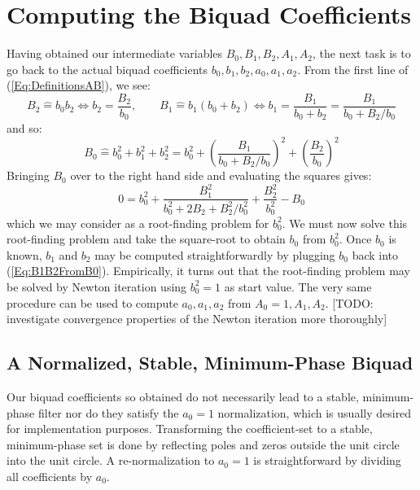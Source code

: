 \section{Computing the Biquad Coefficients}
Having obtained our intermediate variables $B_0, B_1, B_2, A_1, A_2$, the next task is to go back to the actual biquad coefficients $b_0, b_1, b_2, a_0, a_1, a_2$. From the first line of (\ref{Eq:DefinitionsAB}), we see:
\begin{equation}
\label{Eq:B1B2FromB0}
 B_2 \hat{=} b_0 b_2         \Leftrightarrow b_2 = \frac{B_2}{b_0}, \qquad
 B_1 \hat{=} b_1 (b_0 + b_2) \Leftrightarrow b_1 = \frac{B_1}{b_0 + b_2} = \frac{B_1}{b_0 + B_2/b_0}
\end{equation}
and so:
\begin{equation}
 B_0 \hat{=} b_0^2 + b_1^2 + b_2^2 
 =   b_0^2 
   + \left( \frac{B_1}{b_0 + B_2/b_0} \right)^2 
   + \left( \frac{B_2}{b_0}           \right)^2
\end{equation}
Bringing $B_0$ over to the right hand side and evaluating the squares gives:
\begin{equation}
 0 =   b_0^2 
     + \frac{B_1^2}{b_0^2 + 2 B_2 + B_2^2 / b_0^2} 
     + \frac{B_2^2}{b_0^2}
     - B_0
\end{equation}
which we may consider as a root-finding problem for $b_0^2$. We must now solve this root-finding problem and take the square-root to obtain $b_0$ from $b_0^2$. Once $b_0$ is known, $b_1$ and $b_2$ may be computed straightforwardly by plugging $b_0$ back into (\ref{Eq:B1B2FromB0}). Empirically, it turns out that the root-finding problem may be solved by Newton iteration using $b_0^2 = 1$ as start value. The very same procedure can be used to compute $a_0, a_1, a_2$ from $A_0=1, A_1, A_2$. [TODO: investigate convergence properties of the Newton iteration more thoroughly]

\subsection{A Normalized, Stable, Minimum-Phase Biquad}
Our biquad coefficients so obtained do not necessarily lead to a stable, minimum-phase filter nor do they satisfy the $a_0 = 1$ normalization, which is usually desired for implementation purposes. Transforming the coefficient-set to a stable, minimum-phase set is done by reflecting poles and zeros outside the unit circle into the unit circle. A re-normalization to $a_0 = 1$ is straightforward by dividing all coefficients by $a_0$. 


